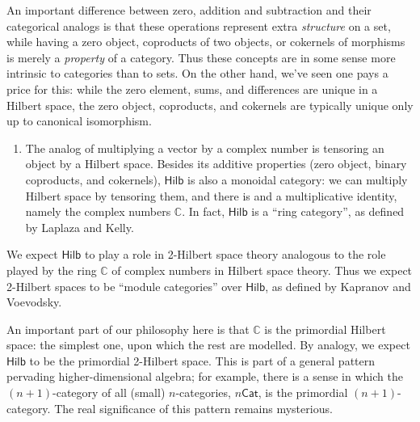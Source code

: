 \documentclass{article}
\def\tightlist{}
\begin{document}
An important difference between zero, addition and subtraction and their
categorical analogs is that these operations represent extra
\emph{structure} on a set, while having a zero object, coproducts of two
objects, or cokernels of morphisms is merely a \emph{property} of a
category. Thus these concepts are in some sense more intrinsic to
categories than to sets. On the other hand, we've seen one pays a price
for this: while the zero element, sums, and differences are unique in a
Hilbert space, the zero object, coproducts, and cokernels are typically
unique only up to canonical isomorphism.

\begin{enumerate}
\def\labelenumi{\arabic{enumi})}
\setcounter{enumi}{3}
\tightlist
\item
  The analog of multiplying a vector by a complex number is tensoring an
  object by a Hilbert space. Besides its additive properties (zero
  object, binary coproducts, and cokernels), \(\mathsf{Hilb}\) is also a
  monoidal category: we can multiply Hilbert space by tensoring them,
  and there is and a multiplicative identity, namely the complex numbers
  \(\mathbb{C}\). In fact, \(\mathsf{Hilb}\) is a ``ring category'', as
  defined by Laplaza and Kelly.
\end{enumerate}

We expect \(\mathsf{Hilb}\) to play a role in 2-Hilbert space theory
analogous to the role played by the ring \(\mathbb{C}\) of complex
numbers in Hilbert space theory. Thus we expect 2-Hilbert spaces to be
``module categories'' over \(\mathsf{Hilb}\), as defined by Kapranov and
Voevodsky.

An important part of our philosophy here is that \(\mathbb{C}\) is the
primordial Hilbert space: the simplest one, upon which the rest are
modelled. By analogy, we expect \(\mathsf{Hilb}\) to be the primordial
2-Hilbert space. This is part of a general pattern pervading
higher-dimensional algebra; for example, there is a sense in which the
\((n+1)\)-category of all (small) \(n\)-categories, \(n\mathsf{Cat}\),
is the primordial \((n+1)\)-category. The real significance of this
pattern remains mysterious.
\end{document}
